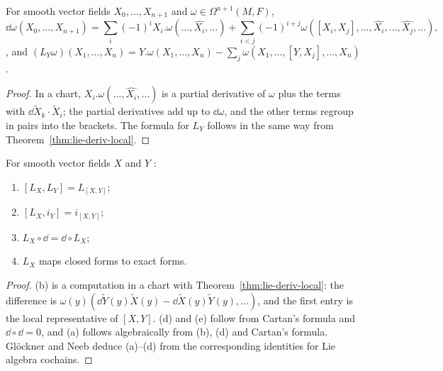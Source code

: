 \begin{theorem}
  \label{thm:fields-formulas}
  \leanok
  For smooth vector fields $X_0, \dots, X_{n+1}$ and $\omega \in \Omega^{n+1}(M, F)$,
  \[
    \dd\omega(X_0, \dots, X_{n+1}) = \sum_i (-1)^i X_i.\omega(\dots, \widehat{X_i}, \dots)
      + \sum_{i<j} (-1)^{i+j} \omega([X_i, X_j], \dots, \widehat{X_i}, \dots, \widehat{X_j},
      \dots),
  \]
  \cite[Proposition~3.6.7, (3.29)]{GN26}, and $(L_Y\omega)(X_1, \dots, X_n) =
  Y.\omega(X_1, \dots, X_n) - \sum_j \omega(X_1, \dots, [Y, X_j], \dots, X_n)$
  \cite[(3.35)]{GN26}.
\end{theorem}

\begin{proof}
  \leanok
  In a chart, $X_i.\omega(\dots, \widehat{X_i}, \dots)$ is a partial derivative of $\omega$ plus
  the terms with $\dd\tilde X_k \cdot \tilde X_i$; the partial derivatives add up to
  $\dd\omega$, and the other terms regroup in pairs into the brackets. The formula for $L_Y$
  follows in the same way from Theorem~\ref{thm:lie-deriv-local}.
\end{proof}

\begin{theorem}
  \label{thm:cartan-calculus}
  \leanok
  For smooth vector fields $X$ and $Y$ \cite[Proposition~3.6.16]{GN26}:
  \begin{enumerate}
    \item[(a)] $[L_X, L_Y] = L_{[X, Y]}$;
    \item[(b)] $[L_X, i_Y] = i_{[X, Y]}$;
    \item[(d)] $L_X \circ \dd = \dd \circ L_X$;
    \item[(e)] $L_X$ maps closed forms to exact forms.
  \end{enumerate}
\end{theorem}

\begin{proof}
  \leanok
  (b) is a computation in a chart with Theorem~\ref{thm:lie-deriv-local}: the difference is
  $\omega(y)(\dd\tilde Y(y)\tilde X(y) - \dd\tilde X(y)\tilde Y(y), \dots)$, and the first
  entry is the local representative of $[X, Y]$. (d) and (e) follow from Cartan's formula and
  $\dd \circ \dd = 0$, and (a) follows algebraically from (b), (d) and Cartan's formula. Glöckner
  and Neeb deduce (a)--(d) from the corresponding identities for Lie algebra cochains.
\end{proof}

